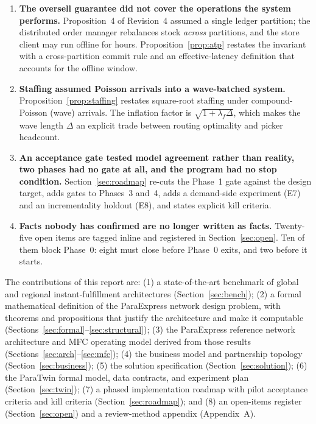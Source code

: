 \documentclass[10pt,twocolumn,letterpaper]{article}
\theoremstyle{definition}
\begin{document}
\begin{enumerate}
\item \textbf{The oversell guarantee did not cover the operations the system performs.} Proposition~4 of Revision~4 assumed a single ledger partition; the distributed order manager rebalances stock \emph{across} partitions, and the store client may run offline for hours. Proposition~\ref{prop:atp} restates the invariant with a cross-partition commit rule and an effective-latency definition that accounts for the offline window.
\item \textbf{Staffing assumed Poisson arrivals into a wave-batched system.} Proposition~\ref{prop:staffing} restates square-root staffing under compound-Poisson (wave) arrivals. The inflation factor is $\sqrt{1+\lambda_f\Delta}$, which makes the wave length $\Delta$ an explicit trade between routing optimality and picker headcount.
\item \textbf{An acceptance gate tested model agreement rather than reality, two phases had no gate at all, and the program had no stop condition.} Section~\ref{sec:roadmap} re-cuts the Phase~1 gate against the design target, adds gates to Phases~3 and~4, adds a demand-side experiment (E7) and an incrementality holdout (E8), and states explicit kill criteria.
\item \textbf{Facts nobody has confirmed are no longer written as facts.} Twenty-five open items are tagged inline and registered in Section~\ref{sec:open}. Ten of them block Phase~0: eight must close before Phase~0 exits, and two before it starts.
\end{enumerate}

The contributions of this report are: (1) a state-of-the-art benchmark of global and regional instant-fulfillment architectures (Section~\ref{sec:bench}); (2) a formal mathematical definition of the ParaExpress network design problem, with theorems and propositions that justify the architecture and make it computable (Sections~\ref{sec:formal}--\ref{sec:structural}); (3) the ParaExpress reference network architecture and MFC operating model derived from those results (Sections~\ref{sec:arch}--\ref{sec:mfc}); (4) the business model and partnership topology (Section~\ref{sec:business}); (5) the solution specification (Section~\ref{sec:solution}); (6) the ParaTwin formal model, data contracts, and experiment plan (Section~\ref{sec:twin}); (7) a phased implementation roadmap with pilot acceptance criteria and kill criteria (Section~\ref{sec:roadmap}); and (8) an open-items register (Section~\ref{sec:open}) and a review-method appendix (Appendix~A).
\end{document}
